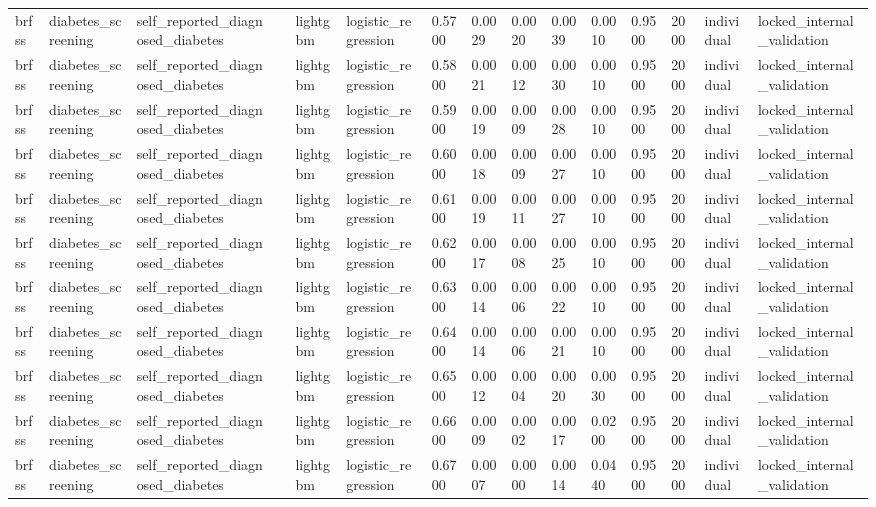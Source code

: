 \begin{tabular}{lllllllllllllll}
brfss & diabetes\_screening & self\_reported\_diagnosed\_diabetes &  & lightgbm & logistic\_regression & 0.5700 & 0.0029 & 0.0020 & 0.0039 & 0.0010 & 0.9500 & 2000 & individual & locked\_internal\_validation \\
brfss & diabetes\_screening & self\_reported\_diagnosed\_diabetes &  & lightgbm & logistic\_regression & 0.5800 & 0.0021 & 0.0012 & 0.0030 & 0.0010 & 0.9500 & 2000 & individual & locked\_internal\_validation \\
brfss & diabetes\_screening & self\_reported\_diagnosed\_diabetes &  & lightgbm & logistic\_regression & 0.5900 & 0.0019 & 0.0009 & 0.0028 & 0.0010 & 0.9500 & 2000 & individual & locked\_internal\_validation \\
brfss & diabetes\_screening & self\_reported\_diagnosed\_diabetes &  & lightgbm & logistic\_regression & 0.6000 & 0.0018 & 0.0009 & 0.0027 & 0.0010 & 0.9500 & 2000 & individual & locked\_internal\_validation \\
brfss & diabetes\_screening & self\_reported\_diagnosed\_diabetes &  & lightgbm & logistic\_regression & 0.6100 & 0.0019 & 0.0011 & 0.0027 & 0.0010 & 0.9500 & 2000 & individual & locked\_internal\_validation \\
brfss & diabetes\_screening & self\_reported\_diagnosed\_diabetes &  & lightgbm & logistic\_regression & 0.6200 & 0.0017 & 0.0008 & 0.0025 & 0.0010 & 0.9500 & 2000 & individual & locked\_internal\_validation \\
brfss & diabetes\_screening & self\_reported\_diagnosed\_diabetes &  & lightgbm & logistic\_regression & 0.6300 & 0.0014 & 0.0006 & 0.0022 & 0.0010 & 0.9500 & 2000 & individual & locked\_internal\_validation \\
brfss & diabetes\_screening & self\_reported\_diagnosed\_diabetes &  & lightgbm & logistic\_regression & 0.6400 & 0.0014 & 0.0006 & 0.0021 & 0.0010 & 0.9500 & 2000 & individual & locked\_internal\_validation \\
brfss & diabetes\_screening & self\_reported\_diagnosed\_diabetes &  & lightgbm & logistic\_regression & 0.6500 & 0.0012 & 0.0004 & 0.0020 & 0.0030 & 0.9500 & 2000 & individual & locked\_internal\_validation \\
brfss & diabetes\_screening & self\_reported\_diagnosed\_diabetes &  & lightgbm & logistic\_regression & 0.6600 & 0.0009 & 0.0002 & 0.0017 & 0.0200 & 0.9500 & 2000 & individual & locked\_internal\_validation \\
brfss & diabetes\_screening & self\_reported\_diagnosed\_diabetes &  & lightgbm & logistic\_regression & 0.6700 & 0.0007 & 0.0000 & 0.0014 & 0.0440 & 0.9500 & 2000 & individual & locked\_internal\_validation \\

\end{tabular}
